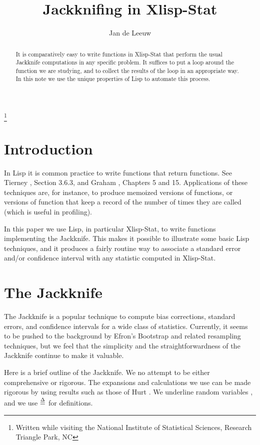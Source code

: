 \documentclass{amsart}
\theoremstyle{definition}
\theoremstyle{remark}
\numberwithin{equation}{section}
\begin{document}
\title[Jackknife]{Jackknifing in Xlisp-Stat}
\author{Jan de Leeuw}
\address{UCLA Statistics Program\\
8118 Mathematical Sciences Building\\
University of California at Los Angeles}
\thanks{Written while visiting the National Institute
of Statistical Sciences, Research Triangle Park, NC}
\maketitle
\begin{abstract}
It is comparatively easy to write functions in Xlisp-Stat
that perform the usual Jackknife computations 
in any specific problem. It suffices to put a loop around
the function we are studying, and to collect the results
of the loop in an appropriate way. In this note we use the unique
properties of Lisp to automate this process.
\end{abstract}
%
\tableofcontents
%
\section{Introduction}\label{s:intro}
%
In Lisp it is common practice to write functions
that return functions. See Tierney
\cite{tierney}, Section 3.6.3, and Graham \cite{graham},
Chapters 5 and 15. Applications of these techniques are,
for instance, to produce memoized versions of functions,
or versions of function that keep a record of the number
of times they are called (which is useful in profiling).
\par
%
In this paper we use Lisp, in particular Xlisp-Stat,
to write functions implementing the Jackknife. This makes
it possible to illustrate some basic Lisp techniques,
and it produces a fairly routine way to associate
a standard error and/or confidence interval with
any statistic computed in Xlisp-Stat.
%
\section{The Jackknife}
%
The Jackknife \cite{miller, tukey} is a popular
technique to compute bias corrections, standard errors,
and confidence intervals for a wide class of statistics.
Currently, it seems to be pushed to the background by
Efron's Bootstrap \cite{efrtib} and related resampling
techniques, but we feel that the simplicity and the
straightforwardness of the Jackknife continue to
make it valuable.\par
%
Here is a brief outline of the Jackknife. We no attempt to be either
comprehensive or rigorous. The expansions and calculations we
use can be made rigorous by using results such as those of Hurt
\cite{hurt}. We underline random variables \cite{hemel}, and we
use $\mathop{=}\limits^{\Delta}$ for definitions.\par
%
\end{document}
